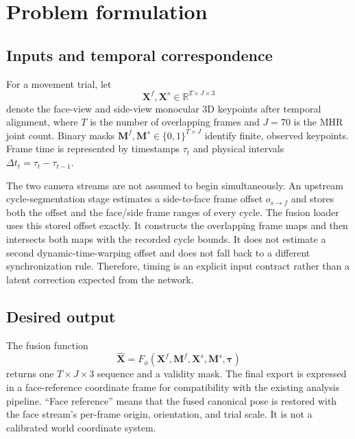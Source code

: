\section{Problem formulation}
\label{sec:problem}

\subsection{Inputs and temporal correspondence}

For a movement trial, let
\begin{equation}
  \mathbf{X}^{f},\mathbf{X}^{s}\in\mathbb{R}^{T\times J\times 3}
\end{equation}
denote the face-view and side-view monocular 3D keypoints after temporal
alignment, where $T$ is the number of overlapping frames and $J=70$ is the MHR
joint count. Binary masks
$\mathbf{M}^{f},\mathbf{M}^{s}\in\{0,1\}^{T\times J}$ identify finite, observed
keypoints. Frame time is represented by timestamps $\tau_t$ and physical
intervals $\Delta t_t=\tau_t-\tau_{t-1}$.

The two camera streams are not assumed to begin simultaneously. An upstream
cycle-segmentation stage estimates a side-to-face frame offset
$o_{s\rightarrow f}$ and stores both the offset and the face/side frame ranges
of every cycle. The fusion loader uses this stored offset exactly. It constructs
the overlapping frame maps and then intersects both maps with the recorded cycle
bounds. It does not estimate a second dynamic-time-warping offset and does not
fall back to a different synchronization rule. Therefore, timing is an explicit
input contract rather than a latent correction expected from the network.

\subsection{Desired output}

The fusion function
\begin{equation}
  \widehat{\mathbf{X}} =
  F_{\phi}(\mathbf{X}^{f},\mathbf{M}^{f},
           \mathbf{X}^{s},\mathbf{M}^{s},\boldsymbol{\tau})
\end{equation}
returns one $T\times J\times3$ sequence and a validity mask. The final export is
expressed in a face-reference coordinate frame for compatibility with the
existing analysis pipeline. ``Face reference'' means that the fused canonical
pose is restored with the face stream's per-frame origin, orientation, and trial
scale. It is not a calibrated world coordinate system.

